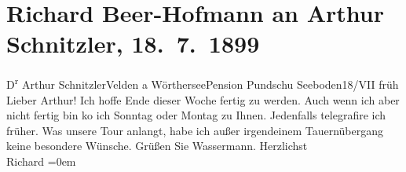 

         
         \renewcommand{\erwaehntePersonen}{Personen: Jakob Wassermann}
         \renewcommand{\erwaehnteOrte}{Orte: Hohe Tauern, Pension Pundschu, Seeboden, Velden am Wörthersee}
         \renewcommand{\erwaehnteWerke}{Werke: Der Tod Georgs}
               \section[Richard Beer-Hofmann an Arthur Schnitzler, 18. 7. 1899]{ Richard Beer-Hofmann an Arthur Schnitzler, 18. 7. 1899}\nopagebreak{}\rehead{ }\begin{ledgroupsized}[t]{13cm}\normalsize\beginnumbering \toendnotes[C]{\smallbreak\pagebreak[2]} 
\toendnotes[C]{\smallbreak}\pstart{}{\pb}D\textsuperscript{r}
                  Arthur Schnitzler\pend{}\pstart{}Velden a Wörthersee\pend{}\pstart{}Pension Pundschu\pend{}{\bigskip}\pstart
           \raggedleft{}{\pb}Seeboden18/VII früh\pend
           \pstart
           Lieber Arthur! Ich hoffe Ende dieser Woche fertig zu werden. Auch
               wenn ich aber nicht fertig bin
                  ko{\geminationm} ich Sonntag oder Montag
               zu Ihnen. Jedenfalls telegrafire ich früher.\pend
           \pstart
           Was unsere Tour anlangt, habe ich außer irgendeinem Tauernübergang keine besondere Wünsche.\pend
           \pstart
           Grüßen Sie Wassermann.\pend
           \pstart
           Herzlichst{\\[\baselineskip]}\spacefill\mbox{Richard}\pend
           \leftskip=0em{}
         
         \endnumbering{}\end{ledgroupsized}  \newcommand{\dateiname}{L00946}\newcommand{\titel}{Richard Beer-Hofmann an Arthur Schnitzler, 18. 7. 1899}\newcommand{\editorInnen}{Martin Anton Müller und Gerd-Hermann Susen}
      